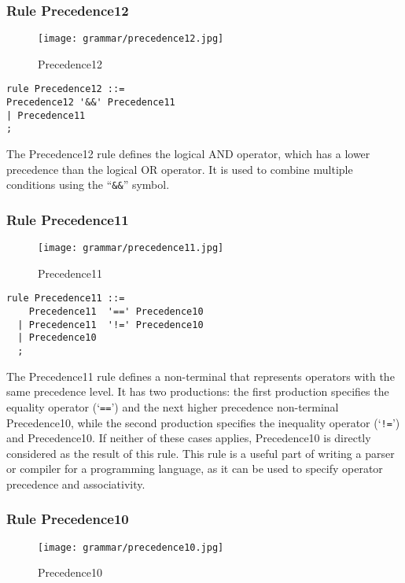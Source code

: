 \subsubsection*{Rule Precedence12}

\begin{figure}[!ht]
\centering
\texttt{[image: grammar/precedence12.jpg]}
\caption{Precedence12}
\end{figure}

\begin{lstlisting}
rule Precedence12 ::=
Precedence12 '&&' Precedence11
| Precedence11
;
\end{lstlisting}

The Precedence12 rule defines the logical AND operator, which has a lower precedence than the logical OR operator. It is used to combine multiple conditions using the ``\verb|&&|'' symbol.

\subsubsection*{Rule Precedence11}

\begin{figure}[!ht]
\centering
\texttt{[image: grammar/precedence11.jpg]}
\caption{Precedence11}
\end{figure}

\begin{lstlisting}
rule Precedence11 ::=
    Precedence11  '==' Precedence10 
  | Precedence11  '!=' Precedence10 
  | Precedence10 
  ;
\end{lstlisting}

The Precedence11 rule defines a non-terminal that represents operators with the same precedence level. It has two productions: the first production specifies the equality operator (`\verb|==|') and the next higher precedence non-terminal Precedence10, while the second production specifies the inequality operator (`\verb|!=|') and Precedence10. If neither of these cases applies, Precedence10 is directly considered as the result of this rule. This rule is a useful part of writing a parser or compiler for a programming language, as it can be used to specify operator precedence and associativity.

\subsubsection*{Rule Precedence10}

\begin{figure}[!ht]
\centering
\texttt{[image: grammar/precedence10.jpg]}
\caption{Precedence10}
\end{figure}

